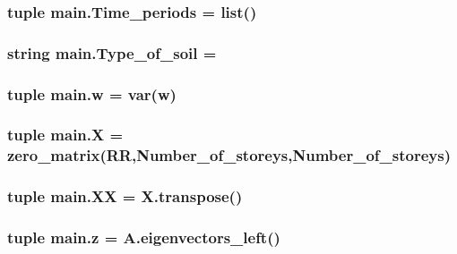 \subsubsection[{Time\+\_\+periods}]{\setlength{\rightskip}{0pt plus 5cm}tuple main.\+Time\+\_\+periods = list()}\label{namespacemain_afe9c3a972582e300106b7dec57600887}
\hypertarget{namespacemain_a52e65712caa18dade1326ad4efeebfa1}{}
\subsubsection[{Type\+\_\+of\+\_\+soil}]{\setlength{\rightskip}{0pt plus 5cm}string main.\+Type\+\_\+of\+\_\+soil = \textquotesingle{}\textquotesingle{}}\label{namespacemain_a52e65712caa18dade1326ad4efeebfa1}
\hypertarget{namespacemain_af76005101c339a32cd5d37ba82ee072c}{}
\subsubsection[{w}]{\setlength{\rightskip}{0pt plus 5cm}tuple main.\+w = var(\textquotesingle{}w\textquotesingle{})}\label{namespacemain_af76005101c339a32cd5d37ba82ee072c}
\hypertarget{namespacemain_a5eac8e4368036ef94463d6e42c1628c5}{}
\subsubsection[{X}]{\setlength{\rightskip}{0pt plus 5cm}tuple main.\+X = zero\+\_\+matrix(R\+R,Number\+\_\+of\+\_\+storeys,Number\+\_\+of\+\_\+storeys)}\label{namespacemain_a5eac8e4368036ef94463d6e42c1628c5}
\hypertarget{namespacemain_ae18df6a00aee4516c7ad8961b666e2a3}{}
\subsubsection[{X\+X}]{\setlength{\rightskip}{0pt plus 5cm}tuple main.\+X\+X = X.\+transpose()}\label{namespacemain_ae18df6a00aee4516c7ad8961b666e2a3}
\hypertarget{namespacemain_a2d5b336e3b2f7d2e14f04fa3cc413457}{}
\subsubsection[{z}]{\setlength{\rightskip}{0pt plus 5cm}tuple main.\+z = A.\+eigenvectors\+\_\+left()}\label{namespacemain_a2d5b336e3b2f7d2e14f04fa3cc413457}
